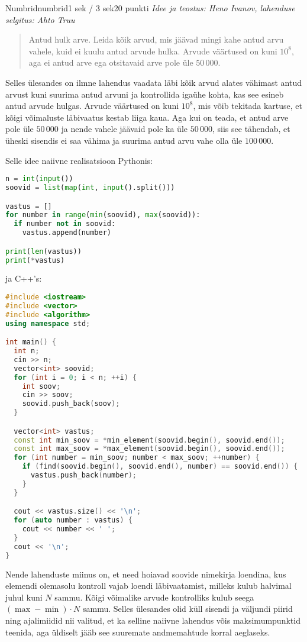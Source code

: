 \begin{yl}{2}{Numbrid}{numbrid}{1 sek / 3 sek}{20 punkti}
  \emph{Idee ja teostus: Heno Ivanov, lahenduse selgitus: Ahto Truu}

  \begin{quote}
    Antud hulk arve. Leida kõik arvud, mis jäävad mingi kahe antud arvu vahele, kuid ei kuulu antud arvude hulka.
    Arvude väärtused on kuni $10^8$, aga ei antud arve ega otsitavaid arve pole üle $50\,000$.
  \end{quote}

Selles ülesandes on ilmne lahendus vaadata läbi kõik arvud alates vähimast antud arvust kuni suurima antud arvuni ja kontrollida igaühe kohta, kas see esineb antud arvude hulgas. Arvude väärtused on kuni $10^8$, mis võib tekitada kartuse, et kõigi võimaluste läbivaatus kestab liiga kaua. Aga kui on teada, et antud arve pole üle $50\,000$ ja nende vahele jäävaid pole ka üle $50\,000$, siis see tähendab, et üheski sisendis ei saa vähima ja suurima antud arvu vahe olla üle $100\,000$.

Selle idee naiivne realisatsioon Pythonis:
\begin{lstlisting}[language=Python]
n = int(input())
soovid = list(map(int, input().split()))

vastus = []
for number in range(min(soovid), max(soovid)):
  if number not in soovid:
    vastus.append(number)

print(len(vastus))
print(*vastus)
\end{lstlisting}
ja C++'s:
\begin{lstlisting}[language=C++]
#include <iostream>
#include <vector>
#include <algorithm>
using namespace std;

int main() {
  int n;
  cin >> n;
  vector<int> soovid;
  for (int i = 0; i < n; ++i) {
    int soov;
    cin >> soov;
    soovid.push_back(soov);
  }

  vector<int> vastus;
  const int min_soov = *min_element(soovid.begin(), soovid.end());
  const int max_soov = *max_element(soovid.begin(), soovid.end());
  for (int number = min_soov; number < max_soov; ++number) {
    if (find(soovid.begin(), soovid.end(), number) == soovid.end()) {
      vastus.push_back(number);
    }
  }

  cout << vastus.size() << '\n';
  for (auto number : vastus) {
    cout << number << ' ';
  }
  cout << '\n';
}
\end{lstlisting}

Nende lahenduste miinus on, et need hoiavad soovide nimekirja loendina, kus elemendi olemasolu kontroll vajab loendi läbivaatamist, milleks kulub halvimal juhul kuni $N$ sammu. Kõigi võimalike arvude kontrolliks kulub seega $(\max - \min) \cdot N$ sammu. Selles ülesandes olid küll sisendi ja väljundi piirid ning ajalimiidid nii valitud, et ka selline naiivne lahendus võis maksimumpunktid teenida, aga üldiselt jääb see suuremate andmemahtude korral aeglaseks.


\end{yl}
